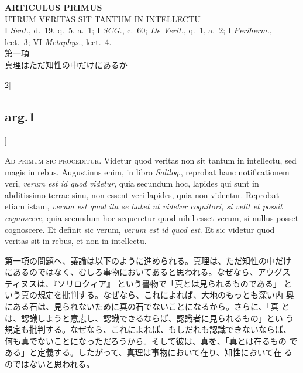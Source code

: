 \documentclass[paper=a4paper,fontsize=10pt,jafontsize=9pt,titlepage]{jlreq}
\begin{document}
\newpage

{}
\setcounter{section}{1}
\setcounter{subsection}{0}
\begin{center}
 {\Large {\bfseries ARTICULUS PRIMUS}}\\
 {\large UTRUM VERITAS SIT TANTUM IN INTELLECTU}\\
 {\footnotesize I {\itshape Sent.}, d.~19, q.~5, a.~1; I {\itshape
 SCG.}, c.~60; {\itshape De Verit.}, q.~1, a.~2; I {\itshape Periherm.},
 lect.~3; VI {\itshape Metaphys.}, lect.~4.}\\
 {\Large 第一項\\真理はただ知性の中だけにあるか}
\end{center}

\begin{paracol}{2}[\subsection{arg.1}]


{\huge A}{\scshape d primum sic proceditur}. Videtur quod veritas non
sit tantum in intellectu, sed magis in rebus. Augustinus enim, in
libro {\itshape Soliloq}., reprobat hanc notificationem veri,
{\itshape verum est id quod videtur}, quia secundum hoc, lapides qui
sunt in abditissimo terrae sinu, non essent veri lapides, quia non
videntur. Reprobat etiam istam, {\itshape verum est quod ita se habet
ut videtur cognitori, si velit et possit cognoscere}, quia secundum
hoc sequeretur quod nihil esset verum, si nullus posset cognoscere. Et
definit sic verum, {\itshape verum est id quod est}. Et sic videtur
quod veritas sit in rebus, et non in intellectu.

\switchcolumn

第一項の問題へ、議論は以下のように進められる。真理は、ただ知性の中だけ
にあるのではなく、むしろ事物においてあると思われる。なぜなら、アウグス
ティヌスは、『ソリロクィア』 という書物で「真とは見られるものである」
という真の規定を批判する。なぜなら、これによれば、大地のもっとも深い内
奥にある石は、見られないために真の石でないことになるから。さらに、「真
とは、認識しようと意志し、認識できるならば、認識者に見られるもの」とい
う規定も批判する。なぜなら、これによれば、もしだれも認識できないならば、
何も真でないことになっただろうから。そして彼は、真を、「真とは在るもの
である」と定義する。したがって、真理は事物において在り、知性において在
るのではないと思われる。




\end{paracol}
\end{document}
